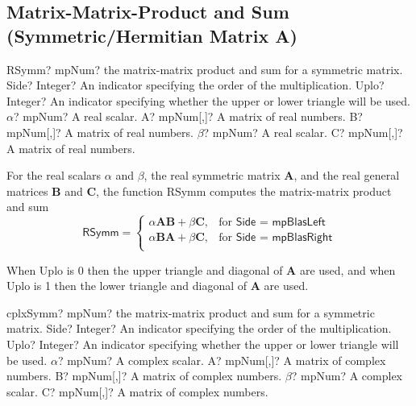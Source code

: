 \newpage
\subsection{Matrix-Matrix-Product and Sum (Symmetric/Hermitian Matrix A)}


\begin{mpFunctionsExtract}
	\mpFunctionSeven
	{RSymm? mpNum? the matrix-matrix product and sum for a symmetric matrix.}
	{Side? Integer? An indicator specifying the order of the multiplication.}
	{Uplo? Integer? An indicator specifying whether the upper or lower triangle will be used.}
	{$\alpha$? mpNum? A real scalar.}
	{A? mpNum[,]? A matrix of real numbers.}
	{B? mpNum[,]? A matrix of real numbers.}
	{$\beta$? mpNum? A real scalar.}
	{C? mpNum[,]? A matrix of real numbers.}
\end{mpFunctionsExtract}

\vspace{0.3cm}
For the real scalars $\alpha$ and $\beta$, the real symmetric matrix $\boldsymbol{A}$, and the real general matrices $\boldsymbol{B}$ and $\boldsymbol{C}$, the function \textsf{RSymm} computes the matrix-matrix product and sum 
\begin{equation}
\textsf{RSymm}=\begin{cases}
\alpha \boldsymbol{A} \boldsymbol{B} + \beta \boldsymbol{C}, & \text{for } \textsf{Side = mpBlasLeft} \\
\alpha \boldsymbol{B} \boldsymbol{A} + \beta \boldsymbol{C}, & \text{for } \textsf{Side = mpBlasRight} \\		
\end{cases}
\end{equation}

When \textsf{Uplo} is 0 then the upper triangle and diagonal of $\boldsymbol{A}$ are used, and when \textsf{Uplo} is 1 then the lower triangle and diagonal of $\boldsymbol{A}$ are used. 

\vspace{0.6cm}
\begin{mpFunctionsExtract}
	\mpFunctionSeven
	{cplxSymm? mpNum? the matrix-matrix product and sum for a symmetric matrix.}
	{Side? Integer? An indicator specifying the order of the multiplication.}
	{Uplo? Integer? An indicator specifying whether the upper or lower triangle will be used.}
	{$\alpha$? mpNum? A complex scalar.}
	{A? mpNum[,]? A matrix of complex numbers.}
	{B? mpNum[,]? A matrix of complex numbers.}
	{$\beta$? mpNum? A complex scalar.}
	{C? mpNum[,]? A matrix of complex numbers.}
\end{mpFunctionsExtract}


